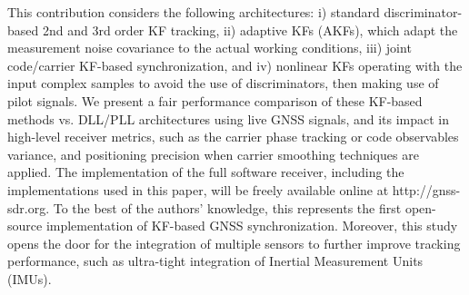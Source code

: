 This contribution considers the following architectures: i) standard discriminator-based 2nd and 3rd order KF tracking, ii) adaptive KFs (AKFs), which adapt the measurement noise covariance to the actual working conditions, iii) joint code/carrier KF-based synchronization, and iv) nonlinear KFs operating with the input complex samples to avoid the use of discriminators, then making use of pilot signals. We present a fair performance comparison of these KF-based methods vs. DLL/PLL architectures using live GNSS signals, and its impact in high-level receiver metrics, such as the carrier phase tracking or code observables variance, and positioning precision when carrier smoothing techniques are applied. The implementation of the full software receiver, including the implementations used in this paper, will be freely available online at http://gnss-sdr.org. To the best of the authors' knowledge, this represents the first open-source implementation of KF-based GNSS synchronization. Moreover, this study opens the door for the integration of multiple sensors to further improve tracking performance, such as ultra-tight integration of Inertial Measurement Units (IMUs).



